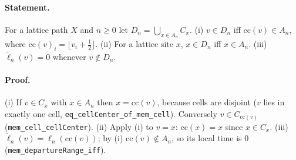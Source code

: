 \paragraph{Statement.} For a lattice path $X$ and $n\ge0$ let $D_n=\bigcup_{x\in A_n}C_x$.
(i) $v\in D_n$ iff $\mathrm{cc}(v)\in A_n$, where $\mathrm{cc}(v)_i=\lfloor v_i+\tfrac12\rfloor$.
(ii) For a lattice site $x$, $x\in D_n$ iff $x\in A_n$.
(iii) $\widetilde\ell_n(v)=0$ whenever $v\notin D_n$.
\paragraph{Proof.} (i) If $v\in C_x$ with $x\in A_n$ then $x=\mathrm{cc}(v)$, because cells are
disjoint ($v$ lies in exactly one cell, \texttt{eq\_cellCenter\_of\_mem\_cell}). Conversely
$v\in C_{\mathrm{cc}(v)}$ (\texttt{mem\_cell\_cellCenter}). (ii) Apply (i) to $v=x$: $\mathrm{cc}(x)=x$
since $x\in C_x$. (iii) $\widetilde\ell_n(v)=\ell_n(\mathrm{cc}(v))$; by (i) $\mathrm{cc}(v)\notin A_n$,
so its local time is $0$ (\texttt{mem\_departureRange\_iff}).
